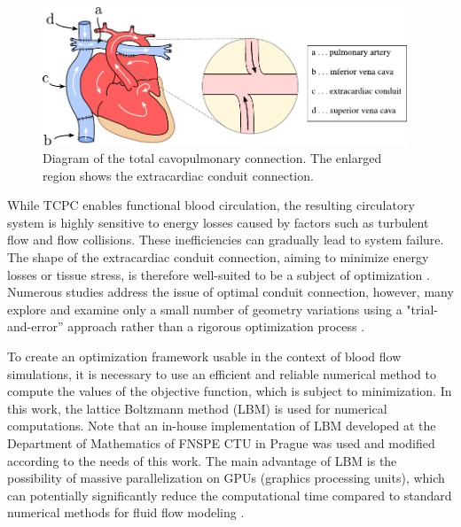 \begin{figure}[h]
	\centering
	\includegraphics[width=0.97\textwidth]{figures/heart.pdf}
	\vspace{5mm}
	\caption{Diagram of the total cavopulmonary connection. The enlarged region shows the extracardiac conduit connection.}
	\label{fig:tcpc}

\end{figure}

While TCPC enables functional blood circulation, the resulting circulatory system is highly sensitive to energy losses caused by factors such as turbulent flow and flow collisions. These inefficiencies can gradually lead to system failure. The shape of the extracardiac conduit connection, aiming to minimize energy losses or tissue stress, is therefore well-suited to be a subject of optimization \cite{Chaloup, vanBake, Wang}. Numerous studies address the issue of optimal conduit connection, however, many explore and examine only a small number of geometry variations using a "trial-and-error” approach rather than a rigorous optimization process \cite{Ensley1999, Rijnberg2018, Porfiryev2020, Tang2014}.

To create an optimization framework usable in the context of blood flow simulations, it is necessary to use an efficient and reliable numerical method to compute the values of the objective function, which is subject to minimization.  In this work, the lattice Boltzmann method (LBM) is used for numerical computations. Note that an in-house implementation of LBM developed at the Department of Mathematics of FNSPE CTU in Prague was used and modified according to the needs of this work. The main advantage of LBM is the possibility of massive parallelization on GPUs (graphics processing units), which can potentially significantly reduce the computational time compared to standard numerical methods for fluid flow modeling \cite{PE, Kruger}.

